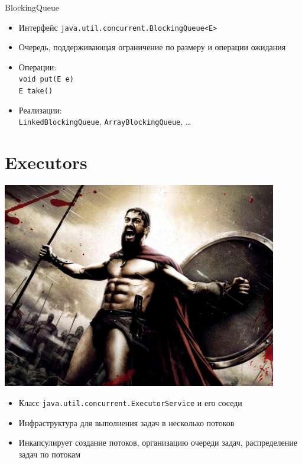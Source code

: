 \documentclass[unicode]{beamer}
\begin{document}
\begin{frame}{BlockingQueue}
\begin{itemize}
\item Интерфейс \texttt{java.util.concurrent.BlockingQueue<E>}
    \bigskip

\item Очередь, поддерживающая ограничение по размеру и операции ожидания
    \bigskip

\item Операции:\\
    \lstinline|void put(E e)|\\
    \lstinline|E take()|
    \bigskip

\item Реализации:\\
    \texttt{LinkedBlockingQueue}, \texttt{ArrayBlockingQueue}, \ldots
\end{itemize}
\end{frame}



\section{Executors}

\begin{frame}
\centering
\includegraphics[width=0.9\textwidth]{pics/executors.jpg}
\end{frame}


\begin{frame}
\begin{itemize}
\item Класс \texttt{java.util.concurrent.ExecutorService} и его соседи
    \bigskip

\item Инфраструктура для выполнения задач в несколько потоков
    \bigskip

\item Инкапсулирует создание потоков, организацию очереди задач,
    распределение задач по потокам
\end{itemize}
\end{frame}
\end{document}
